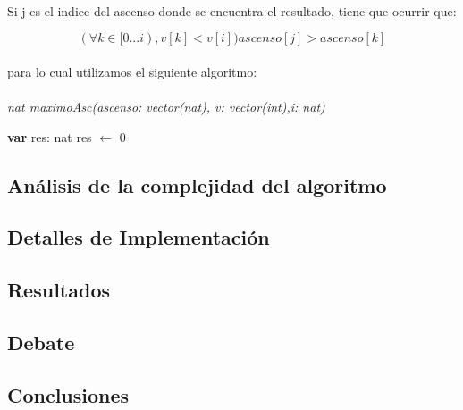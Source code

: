 \paragraph{}
Si j es el indice del ascenso donde se encuentra el resultado, tiene que ocurrir que:

$$(\forall k \in [0...i) , v[k]<v[i]) ascenso[j] > ascenso[k]$$


\paragraph{}
para lo cual utilizamos el siguiente algoritmo:


\paragraph{}
\textit{nat maximoAsc(ascenso: vector(nat), v: vector(int),i: nat)}\\
	\begin{algorithm}[H]
	
      \textbf{var} res: nat
      res $\leftarrow$ 0
	
  \end{algorithm}

\vspace*{30cm}
		


\subsection{Análisis de la complejidad del algoritmo}
\subsection{Detalles de Implementación}
\subsection{Resultados}
\label{Resultados1}
\subsection{Debate}
\subsection{Conclusiones}
